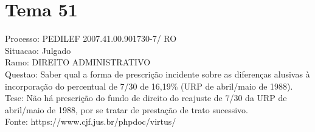 \documentclass[12pt]{article}
\begin{document}
\section*{Tema 51}
Processo: PEDILEF 2007.41.00.901730-7/ RO\\
Situacao: Julgado\\
Ramo: DIREITO ADMINISTRATIVO\\
Questao: Saber qual a forma de prescrição incidente sobre as diferenças alusivas à incorporação do percentual de 7/30 de 16,19\% (URP de abril/maio de 1988).\\
Tese: Não há prescrição do fundo de direito do reajuste de 7/30 da URP de abril/maio de 1988, por se tratar de prestação de trato sucessivo.\\
Fonte: https://www.cjf.jus.br/phpdoc/virtus/
\end{document}
